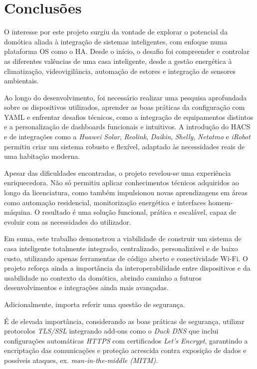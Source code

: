 \chapter{Conclusões}\label{cap:conclusions}

O interesse por este projeto surgiu da vontade de explorar o potencial da domótica aliada à integração de sistemas inteligentes, com enfoque numa plataforma \gls{OS} como o \gls{HA}. Desde o início, o desafio foi compreender e controlar as diferentes valências de uma casa inteligente, desde a gestão energética à climatização, videovigilância, automação de estores e integração de sensores ambientais.

Ao longo do desenvolvimento, foi necessário realizar uma pesquisa aprofundada sobre os dispositivos utilizados, aprender as boas práticas da configuração com \gls{YAML} e enfrentar desafios técnicos, como a integração de equipamentos distintos e a personalização de dashboards funcionais e intuitivos. A introdução do \gls{HACS} e de integrações como a \textit{Huawei Solar}, \textit{Reolink}, \textit{Daikin}, \textit{Shelly}, \textit{Netatmo} e \textit{iRobot} permitiu criar um sistema robusto e flexível, adaptado às necessidades reais de uma habitação moderna.

Apesar das dificuldades encontradas, o projeto revelou-se uma experiência enriquecedora. Não só permitiu aplicar conhecimentos técnicos adquiridos ao longo da licenciatura, como também impulsionou novas aprendizagens em áreas como automação residencial, monitorização energética e interfaces homem-máquina. O resultado é uma solução funcional, prática e escalável, capaz de evoluir com as necessidades do utilizador.

Em suma, este trabalho demonstrou a viabilidade de construir um sistema de casa inteligente totalmente integrado, centralizado, personalizável e de baixo custo, utilizando apenas ferramentas de código aberto e conectividade Wi-Fi. O projeto reforça ainda a importância da interoperabilidade entre dispositivos e da usabilidade no contexto da domótica, abrindo caminho a futuros desenvolvimentos e integrações ainda mais avançadas.


\newpage
Adicionalmente, importa referir uma questão de segurança.


É de elevada importância, considerando as boas práticas de segurança, utilizar protocolos \textit{TLS/SSL} integrando add-ons como o \textit{Duck DNS} que inclui configurações automáticas \textit{HTTPS} com certificados \textit{Let's Encrypt}, garantindo a encriptação das comunicações e proteção acrescida contra exposição de dados e possíveis ataques, ex. \textit{man-in-the-middle (MITM)}.


